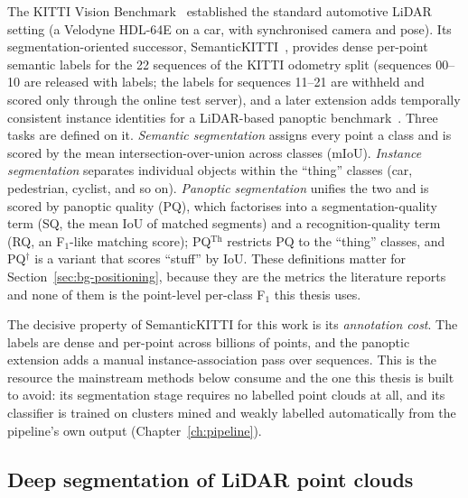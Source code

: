 The KITTI Vision Benchmark~\cite{geiger2012we} established the standard automotive
LiDAR setting (a Velodyne HDL-64E on a car, with synchronised camera and pose). Its
segmentation-oriented successor, SemanticKITTI~\cite{Behley_2019_ICCV}, provides
dense per-point semantic labels for the 22 sequences of the KITTI odometry split
(sequences 00--10 are released with labels; the labels for sequences 11--21 are withheld
and scored only through the online test server), and a later extension adds temporally
consistent instance identities for a LiDAR-based panoptic benchmark~\cite{behley2021panoptic}. Three tasks are defined on
it. \emph{Semantic segmentation} assigns every point a class and is scored by the mean
intersection-over-union across classes (mIoU). \emph{Instance segmentation} separates
individual objects within the ``thing'' classes (car, pedestrian, cyclist, and so on).
\emph{Panoptic segmentation} unifies the two and is scored by panoptic quality (PQ),
which factorises into a segmentation-quality term (SQ, the mean IoU of matched
segments) and a recognition-quality term (RQ, an F$_1$-like matching score);
PQ$^{\text{Th}}$ restricts PQ to the ``thing'' classes, and PQ$^\dagger$ is a variant
that scores ``stuff'' by IoU. These definitions matter for
Section~\ref{sec:bg-positioning}, because they are the metrics the literature reports
and none of them is the point-level per-class F$_1$ this thesis uses.

The decisive property of SemanticKITTI for this work is its \emph{annotation cost}.
The labels are dense and per-point across billions of points, and the panoptic
extension adds a manual instance-association pass over sequences. This is the resource
the mainstream methods below consume and the one this thesis is built to avoid: its
segmentation stage requires no labelled point clouds at all, and its classifier is
trained on clusters mined and weakly labelled automatically from the pipeline's own
output (Chapter~\ref{ch:pipeline}).

\subsection{Deep segmentation of LiDAR point clouds}
\label{sec:bg-deep}

